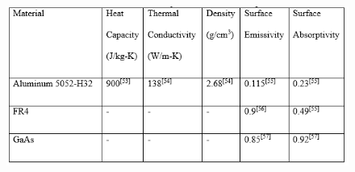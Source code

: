 \documentclass[final]{cubedoc}
\begin{document}
	\begin{figure}[h!]
		\centering
		\includegraphics[keepaspectratio, width=\textwidth]{docs/fr4_emiss.png}
		\caption{\cite[p.93]{rathbun2017design}}
		\label{fig:fr4}
	\end{figure}
	
\end{document}
